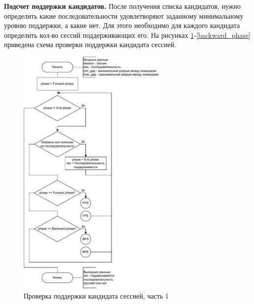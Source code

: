 
\newpage %
\textbf{Подсчет поддержки кандидатов.}
После получения списка кандидатов, нужно определить какие последовательности удовлетворяют заданному минимальному уровню поддержки, а какие нет. Для этого необходимо для каждого кандидата определить кол-во сессий поддерживающих его. На рисунках \ref{sessionSupportsSequence}-\ref{backward_phase} приведена схема проверки поддержки кандидата сессией.


\begin{figure}[h!]
	\centering
	\includegraphics[width=0.65\textwidth]{inc/img/sessionSupportsSequence2.drawio.pdf}
	\caption{Проверка поддержки кандидата сессией, часть 1}
	\label{sessionSupportsSequence}
\end{figure}

